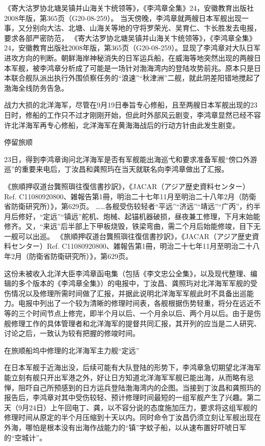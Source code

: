\documentclass[12pt,UTF8]{ctexbook}
\begin{document}
《寄大沽罗协北塘吴镇并山海关卞统领等》，《李鸿章全集》24，安徽教育出版社2008年版，第365页（G20-08-259）。
当天傍晚，李鸿章就两艘日本军舰出现一事，又分别向大沽、北塘、山海关等地的守将罗荣光、吴育仁、卞长胜发去电报，要求各部严密防范， 《寄大沽罗协北塘吴镇并山海关卞统领等》，《李鸿章全集》24，安徽教育出版社2008年版，第365页（G20-08-259）。显现了李鸿章对大队日军进攻方向的判断。朝鲜海岸神秘消失的日军运兵船，在威海等地突然出现的两艘日本军舰，被李鸿章分析成了可能是一场针对渤海湾内的登陆攻势前兆。原本只是日本联合舰队派出执行外围侦察任务的“浪速”“秋津洲”二舰，就此阴差阳错地搅起了渤海全线防务告急。

战力大损的北洋海军，尽管在9月19日奉旨专心修船，且至两艘日本军舰出现的23日时，修船的工作只不过才刚刚开始，但此时外部风云剧变，李鸿章显然已经不容许北洋海军再专心修船，北洋海军在黄海海战后的行动方针由此发生剧变。

停留旅顺

23日，得到李鸿章询问北洋海军是否有军舰能出海巡弋和要求准备军舰“傍口外游巡”的重要来电后，丁汝昌和龚照玙在当天就联名向李鸿章做出了汇报。

《旅順押収道台龔照璵往復信書抄訳》，《JACAR（アジア歴史資料センター）Ref. C11080920800、雑報告第1冊，明治二十七年11月至明治二十八年2月（防衛省防衛研究所）》，第629页。
……各舰受伤较轻者“平远”“济远”“靖远”“广丙”，约半月后修好，“定远”“镇远”舵机、炮械、起锚机器破损，昼夜兼工修理，下月末始能修齐。又，“来远”后半部上下甲板烧毁，铁梁弯曲，需二个月后始能修竣，目下无一舰可以出巡。 《旅順押収道台龔照璵往復信書抄訳》，《JACAR（アジア歴史資料センター）Ref. C11080920800、雑報告第1冊，明治二十七年11月至明治二十八年2月（防衛省防衛研究所）》，第629页。

这份未被收入北洋大臣李鸿章函电集（包括《李文忠公全集》，以及现代整理、编辑的多个版本的《李鸿章全集》）的电报中，丁汝昌、龚照玙对北洋海军军舰的受伤情况以及修理所需时间做了汇报，并据此说明北洋海军军舰此时不具备出巡能力。电报中列出了一个较为清晰的修理时间表，各舰根据伤势轻重，将分在远近不等的三个时间节点上修完，即半个月以后、一个月余以后、两个月以后。由于是伤舰修理工作的具体管理者和北洋海军的提督共同汇报，其开列的应当是二人研究、讨论之后，一致认为较有把握的修竣时间。


在旅顺船坞中修理的北洋海军主力舰“定远”

在日本军舰于近海出没，后续可能有大队登陆的形势下，李鸿章急切期望北洋海军能立刻有舰只开出军港之外，好让日方知道北洋海军军舰已能出海，从而略有忌惮，阻吓自己所预感到的日方运兵登陆渤海湾内的企图。当接到丁汝昌和龚照玙的报告后，李鸿章对其中受伤较轻、预计修理时间最短的一组军舰产生了兴趣。第二天（9月24日）上午回电丁、龚，以不容分说的态度施加压力，要求将这组军舰的修理时间从原定的半个月压缩到十天以内。同时命令丁汝昌仍须立刻让军舰出现在外海，哪怕是根本没有出海作战能力的“镇”字蚊子船，以从速布置好吓唬日军的“空城计”。
\end{document}
